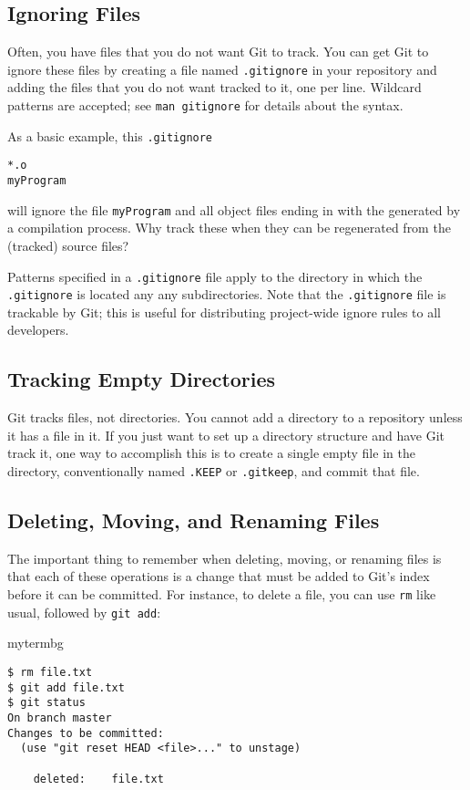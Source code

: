 \subsection{Ignoring Files}

Often, you have files that you do not want Git to track.  You can get Git to
ignore these files by creating a file named \texttt{.gitignore} in your
repository and adding the files that you do not want tracked to it, one per
line.  Wildcard patterns are accepted; see  \texttt{man gitignore} for details
about the syntax.

As a basic example, this \texttt{.gitignore}

\begin{verbatim}
*.o
myProgram
\end{verbatim}

will ignore the file \texttt{myProgram} and all object files ending in with the
generated by a compilation process.  Why track these when they can be
regenerated from the (tracked) source files?

Patterns specified in a \texttt{.gitignore} file apply to the directory in
which the \texttt{.gitignore} is located any any subdirectories.  Note that the
\texttt{.gitignore} file is trackable by Git; this is useful for distributing
project-wide ignore rules to all developers.

\subsection{Tracking Empty Directories}

Git tracks files, not directories.  You cannot add a directory to a repository
unless it has a file in it.  If you just want to set up a directory structure
and have Git track it, one way to accomplish this is to create a single empty
file in the directory, conventionally named \texttt{.KEEP} or
\texttt{.gitkeep}, and commit that file.

\subsection{Deleting, Moving, and Renaming Files}

The important thing to remember when deleting, moving, or renaming files is
that each of these operations is a change that must be added to Git's index
before it can be committed.  For instance, to delete a file, you can use
\texttt{rm} like usual, followed by \texttt{git add}:

\begin{tsession}{mytermbg}
\begin{verbatim}
$ rm file.txt
$ git add file.txt
$ git status
On branch master
Changes to be committed:
  (use "git reset HEAD <file>..." to unstage)

	deleted:    file.txt

\end{verbatim}
\end{tsession}

